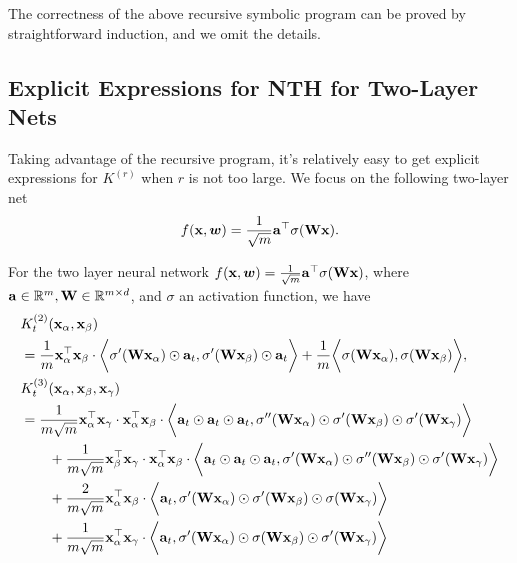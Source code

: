 The correctness of the above recursive symbolic program can be proved by straightforward induction, and we omit the details.

\subsection{Explicit Expressions for NTH for Two-Layer Nets}
Taking advantage of the recursive program, it's relatively easy to get explicit expressions for $K^{(r)}$ when $r$ is not too large. We focus on the following two-layer net
\begin{equation}
	f({\mathbf{x}}, {\boldsymbol{w}}) = \frac{1}{\sqrt{m}} {\mathbf{a}}^\top \sigma({\mathbf{W}}  {\mathbf{x}}).
\end{equation}


\begin{proposition}
\label{prop: K_2_K_3_two_layer_net}
	For the two layer neural network $f({\mathbf{x}}, {\boldsymbol{w}}) = \frac{1}{\sqrt{m}}{\mathbf{a}}^\top \sigma({\mathbf{W}}  {\mathbf{x}})$, where ${\mathbf{a}}\in {\mathbb{R}}^m, {\mathbf{W}} \in {\mathbb{R}}^{m\times d}$, and $\sigma$ an activation function, we have
	\begingroup
	\allowdisplaybreaks
	\begin{align}
		& \KK_t(\rvx_\alpha, \rvx_\beta) \nonumber\\
		\label{eq: K_2_two_layer}	
		&= \frac{1}{m} \rvx_\alpha^\top  \rvx_\beta \cdot \bigg\la \sigma'(\rmW  \rvx_\alpha)\odot \rva_t, \sigma'(\rmW  \rvx_\beta)\odot \rva_t  \bigg\ra + \frac{1}{m} \bigg\la \sigma(\rmW  \rvx_\alpha), \sigma(\rmW  \rvx_\beta) \bigg\ra ,\\
		& \KKK_t(\rvx_\alpha, \rvx_\beta, \rvx_\gamma) \nonumber\\
		& =\frac{1}{m\sqrt{m}} \rvx_\alpha^\top \rvx_\gamma \cdot  \rvx_\alpha^\top \rvx_\beta \cdot \bigg\la \rva_t \odot \rva_t\odot \rva_t , \sigma''(\rmW  \rvx_\alpha)\odot \sigma'(\rmW  \rvx_\beta)\odot \sigma'(\rmW  \rvx_\gamma) \bigg\ra \nonumber \\
		& \qquad + \frac{1}{m\sqrt{m}}\rvx_\beta^\top\rvx_\gamma \cdot \rvx_\alpha^\top\rvx_\beta \cdot \bigg\la\rva_t \odot\rva_t\odot\rva_t , \sigma'(\rmW\rvx_\alpha)\odot \sigma''(\rmW\rvx_\beta) \odot \sigma'(\rmW\rvx_\gamma) \bigg\ra \nonumber \\
		& \qquad + \frac{2}{m\sqrt{m}} \rvx_\alpha^\top\rvx_\beta \cdot \bigg\la\rva_t, \sigma'(\rmW\rvx_\alpha)\odot \sigma'(\rmW\rvx_\beta)\odot \sigma(\rmW\rvx_\gamma)\bigg\ra \nonumber\\ 
		& \qquad + \frac{1}{m\sqrt{m}}\rvx_\alpha^\top\rvx_\gamma \cdot \bigg\la\rva_t, \sigma'(\rmW \rvx_\alpha)\odot \sigma(\rmW \rvx_\beta)\odot \sigma'(\rmW \rvx_\gamma) \bigg\ra \nonumber \\

\end{align}
\end{proposition}
